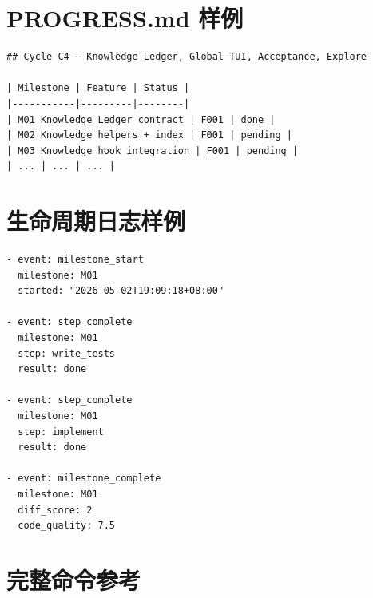 \documentclass[
  outputdir=build,
  chapterstyle=cn,
  colorscheme=Simple,
  fontset=tech,
  code=false
]{Hypo-Note}
\begin{document}
\section{PROGRESS.md 样例}

\begin{lstlisting}[caption=PROGRESS.md 样例]
## Cycle C4 — Knowledge Ledger, Global TUI, Acceptance, Explore

| Milestone | Feature | Status |
|-----------|---------|--------|
| M01 Knowledge Ledger contract | F001 | done |
| M02 Knowledge helpers + index | F001 | pending |
| M03 Knowledge hook integration | F001 | pending |
| ... | ... | ... |
\end{lstlisting}

\section{生命周期日志样例}

\begin{lstlisting}[caption=log.yaml 样例]
- event: milestone_start
  milestone: M01
  started: "2026-05-02T19:09:18+08:00"

- event: step_complete
  milestone: M01
  step: write_tests
  result: done

- event: step_complete
  milestone: M01
  step: implement
  result: done

- event: milestone_complete
  milestone: M01
  diff_score: 2
  code_quality: 7.5
\end{lstlisting}

\section{完整命令参考}
\end{document}
